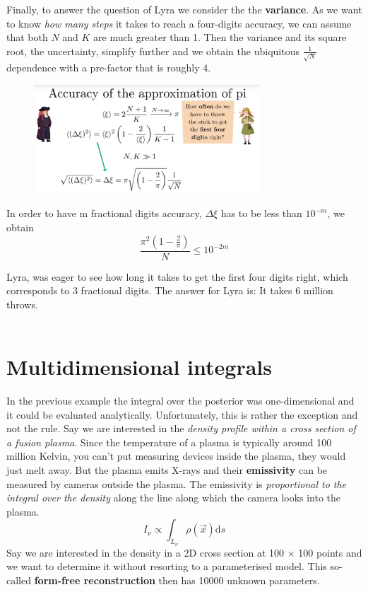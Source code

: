 \documentclass[12pt, a4paper]{scrartcl}
\begin{document}
Finally, to answer the question of Lyra we consider the the \textbf{variance}. 
As we want to know \textit{how many steps} it takes to reach a four-digits accuracy,
we can assume that both $N$ and $K$ are much greater than 1. Then the
variance and its square root, the uncertainty, simplify further
and we obtain the ubiquitous $\frac{1}{\sqrt{N}}$ dependence with a
pre-factor that is roughly 4.%
 \begin{figure}[H]
	\centering
	\includegraphics[width=0.75\textwidth]{9_4.png}
\end{figure}
In order to have m fractional digits accuracy, $\Delta \xi$ has to be less than $10^{-m}$, we obtain \[\frac{\pi^2(1-\frac{2}{\pi})}{N}\leq 10^{-2m}\]

Lyra, was eager to see how long it takes to get the first four digits right,
which corresponds to 3 fractional digits. The answer for
Lyra is: It takes 6 million throws.\\

\\

\section*{Multidimensional integrals}
In the previous example the integral over the posterior was one-dimensional
and it could be evaluated analytically. Unfortunately, this is rather the exception and not the rule.
Say we are interested in the \textit{density profile within a cross section of a
fusion plasma}. Since the temperature of a plasma is typically around 100 million
Kelvin, you can’t put measuring devices inside the plasma, they would
just melt away. But the plasma emits X-rays and their  \textbf{emissivity} can be
measured by cameras outside the plasma. The emissivity is \textit{proportional to
the integral over the density} along the line along which the camera looks
into the plasma.
\[I_{\nu}\propto \int_{L_{\nu}}\rho(\vec{x})\text{d}s\]
Say we are interested in the density in a 2D cross section at 100 × 100 points
and we want to determine it without resorting to a parameterised model.
This so-called  \textbf{form-free reconstruction} then has 10000 unknown parameters.\\
\end{document}
